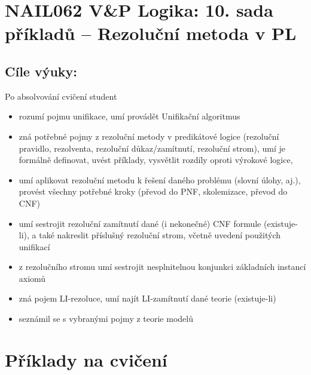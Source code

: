 \section*{NAIL062 V\&P Logika: 10. sada příkladů -- Rezoluční metoda v PL}


\subsection*{Cíle výuky:} Po absolvování cvičení student

    \begin{itemize}\setlength{\itemsep}{0pt}
        \item rozumí pojmu unifikace, umí provádět Unifikační algoritmus
        \item zná potřebné pojmy z rezoluční metody v predikátové logice (rezoluční pravidlo, rezolventa, rezoluční důkaz/zamítnutí, rezoluční strom), umí je formálně definovat, uvést příklady, vysvětlit rozdíly oproti výrokové logice, 
        \item umí aplikovat rezoluční metodu k řešení daného problému (slovní úlohy, aj.), provést všechny potřebné kroky (převod do PNF, skolemizace, převod do CNF)
        \item umí sestrojit rezoluční zamítnutí dané (i nekonečné) CNF formule (existuje-li), a také nakreslit příslušný rezoluční strom, včetně uvedení použitých unifikací
        \item z rezolučního stromu umí sestrojit nesplnitelnou konjunkci základních instancí axiomů
        \item zná pojem LI-rezoluce, umí najít LI-zamítnutí dané teorie (existuje-li)
        \item seznámil se s vybranými pojmy z teorie modelů
    \end{itemize}
    

\section*{Příklady na cvičení}


